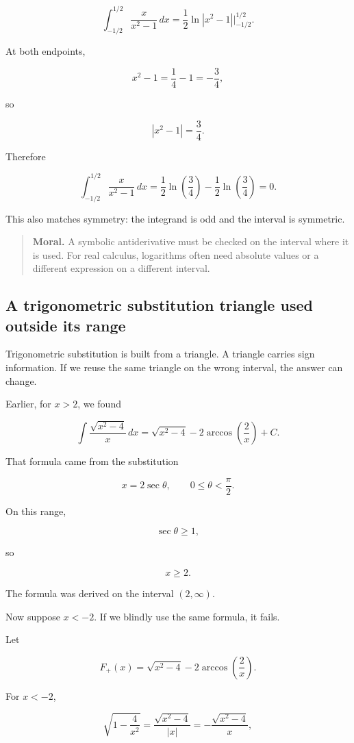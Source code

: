 \[
\int_{-1/2}^{1/2}\frac{x}{x^2-1}\,dx
=
\frac12\ln|x^2-1|\Big|_{-1/2}^{1/2}.
\]

At both endpoints,

\[
x^2-1=\frac14-1=-\frac34,
\]

so

\[
|x^2-1|=\frac34.
\]

Therefore

\[
\int_{-1/2}^{1/2}\frac{x}{x^2-1}\,dx
=
\frac12\ln\left(\frac34\right)
-
\frac12\ln\left(\frac34\right)
=
\boxed{0}.
\]

This also matches symmetry: the integrand is odd and the interval is symmetric.

\begin{quote}
\textbf{Moral.}
A symbolic antiderivative must be checked on the interval where it is used.  For real
calculus, logarithms often need absolute values or a different expression on a different
interval.
\end{quote}

\subsection{A trigonometric substitution triangle used outside its range}
\label{subsec:trig-substitution-wrong-range}

Trigonometric substitution is built from a triangle.  A triangle carries sign information.
If we reuse the same triangle on the wrong interval, the answer can change.

Earlier, for \(x>2\), we found

\[
\int \frac{\sqrt{x^2-4}}{x}\,dx
=
\sqrt{x^2-4}
-
2\arccos\left(\frac{2}{x}\right)
+C.
\]

That formula came from the substitution

\[
x=2\sec\theta,
\qquad
0\le\theta<\frac{\pi}{2}.
\]

On this range,

\[
\sec\theta\ge1,
\]

so

\[
x\ge2.
\]

The formula was derived on the interval \((2,\infty)\).

Now suppose \(x<-2\).  If we blindly use the same formula, it fails.

Let

\[
F_+(x)=\sqrt{x^2-4}-2\arccos\left(\frac2x\right).
\]

For \(x<-2\),

\[
\sqrt{1-\frac4{x^2}}
=
\frac{\sqrt{x^2-4}}{|x|}
=
-\frac{\sqrt{x^2-4}}{x},
\]

